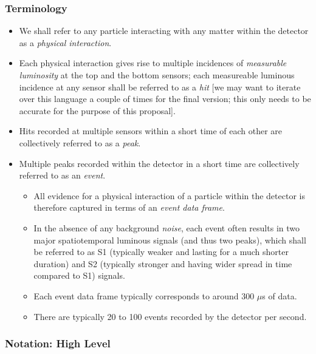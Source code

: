 \documentclass[]{article}
\providecommand{\tightlist}{%
  \setlength{\itemsep}{0pt}\setlength{\parskip}{0pt}}
\begin{document}
\subsubsection{Terminology}

\begin{itemize}
\tightlist
\item
  We shall refer to any particle interacting with any matter within the detector as a \emph{physical interaction}.
\item
  Each physical interaction gives rise to multiple incidences of \emph{measurable luminosity} at the top and the bottom sensors; each measureable luminous incidence at any sensor shall be referred to as a \emph{hit} {[}we may want to iterate over this language a couple of times for the final version; this only needs to be accurate for the purpose of this proposal{]}.
\item
  Hits recorded at multiple sensors within a short time of each other are collectively referred to as a \emph{peak}.
\item
  Multiple peaks recorded within the detector in a short time are collectively referred to as an \emph{event}.

  \begin{itemize}
  \tightlist
  \item
    All evidence for a physical interaction of a particle within the detector is therefore captured in terms of an \emph{event data frame}.
  \item
    In the absence of any background \emph{noise}, each event often results in two major spatiotemporal luminous signals (and thus two peaks), which shall be referred to as S1 (typically weaker and lasting for a much shorter duration) and S2 (typically stronger and having wider spread in time compared to S1) signals.
  \item
    Each event data frame typically corresponds to around \(300\) \(\mu\)s of data.
  \item
    There are typically 20 to 100 events recorded by the detector per second.
  \end{itemize}
\end{itemize}

\subsubsection{Notation: High Level}
\end{document}

